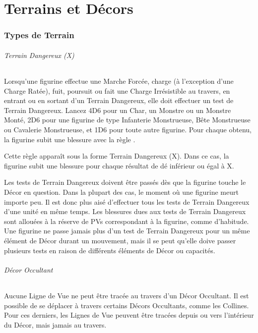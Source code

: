 
\part{Terrains et Décors}

\hypertarget{terraintypes}{\section{Types de Terrain}}
\label{terrain_types}

\paragraph{Terrain Dangereux (X)}

Lorsqu'une figurine effectue une Marche Forcée, charge (à l'exception d'une Charge Ratée), fuit, poursuit ou fait une Charge Irrésistible au travers, en entrant ou en sortant d'un Terrain Dangereux, elle doit effectuer un test de Terrain Dangereux. Lancez 4D6 pour un Char, un Monstre ou un Monstre Monté, 2D6 pour une figurine de type Infanterie Monstrueuse, Bête Monstrueuse ou Cavalerie Monstrueuse, et 1D6 pour toute autre figurine. Pour chaque  obtenu, la figurine subit une blessure avec la règle .

Cette règle apparaît sous la forme Terrain Dangereux (X). Dans ce cas, la figurine subit une blessure pour chaque résultat de dé inférieur ou égal à X.

Les tests de Terrain Dangereux doivent être passés dès que la figurine touche le Décor en question. Dans la plupart des cas, le moment où une figurine meurt importe peu. Il est donc plus aisé d'effectuer tous les tests de Terrain Dangereux d'une unité en même temps. Les blessures dues aux tests de Terrain Dangereux sont allouées à la réserve de PVs correspondant à la figurine, comme d'habitude. Une figurine ne passe jamais plus d'un test de Terrain Dangereux pour un même élément de Décor durant un mouvement, mais il se peut qu'elle doive passer plusieurs tests en raison de différents éléments de Décor ou capacités.

\paragraph{Décor Occultant}

Aucune Ligne de Vue ne peut être tracée au travers d'un Décor Occultant. Il est possible de se déplacer à travers certains Décors Occultants, comme les Collines. Pour ces derniers, les Lignes de Vue peuvent être tracées depuis ou vers l'intérieur du Décor, mais jamais au travers. 

